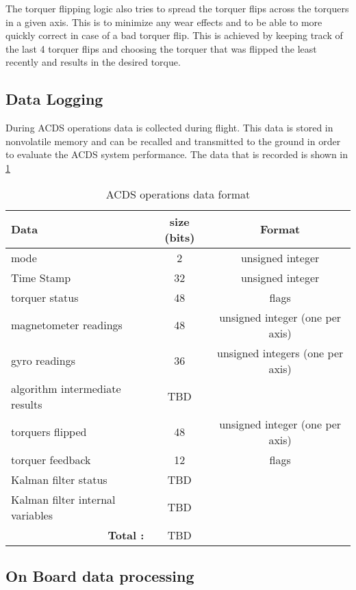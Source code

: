 The torquer flipping logic also tries to spread the torquer flips across the torquers in a given axis. This is to minimize any wear effects and to be able to more quickly correct in case of a bad torquer flip. This is achieved by keeping track of the last 4 torquer flips and choosing the torquer that was flipped the least recently and results in the desired torque.

\subsection{Data Logging}

During \ac{ACDS} operations data is collected during flight. This data is stored in nonvolatile memory and can be recalled and transmitted to the ground in order to evaluate the \ac{ACDS} system performance. The data that is recorded is shown in \cref{tab:logdat}

\begin{table}[H]
    \centering
    \caption{\ac{ACDS} operations data format}
    \label{tab:logdat}
    \begin{tabular}{|l|c|c|}
        \hline
        Data&size (bits)&Format\\
        \hline
        mode&2&unsigned integer\\
        \hline
        Time Stamp&32&unsigned integer\\
        \hline
        torquer status&48&flags\\
        \hline
        magnetometer readings&48&unsigned integer (one per axis)\\
        \hline
        gyro readings&36&unsigned integers (one per axis)\\
        \hline
        algorithm intermediate results&TBD&\\
        \hline
        torquers flipped&48&unsigned integer (one per axis)\\
        \hline
        torquer feedback&12&flags\\
        \hline
        Kalman filter status&TBD&\\
        \hline
        Kalman filter internal variables&TBD&\\
        \hline
        \multicolumn{1}{|r|}{\bfseries Total :}&TBD&\\
        \hline
    \end{tabular}
\end{table}

\subsection{On Board data processing}

